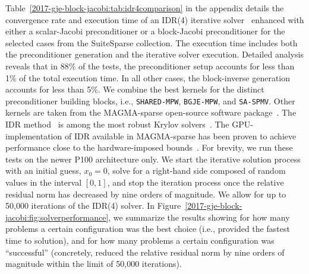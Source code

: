 Table~\ref{2017-gje-block-jacobi:tab:idr4comparison} in the appendix details the convergence rate and
execution time of an IDR(4) iterative solver~\cite{idr1} enhanced with either a
scalar-Jacobi preconditioner or a block-Jacobi preconditioner for the selected
cases from the SuiteSparse collection. The execution time includes both the
preconditioner generation and the iterative solver execution. 
Detailed analysis reveals that in 88\% of the tests, the preconditioner setup
accounts for less than 1\% of the total execution time. In all other cases, the
block-inverse generation accounts for less than 5\%.
We combine the best
kernels for the distinct preconditioner building blocks, i.e., {\tt SHARED-MPW},
{\tt BGJE-MPW}, and {\tt SA-SPMV}. Other kernels are taken from the MAGMA-sparse
open-source software package~\cite{magma}. The IDR method~\cite{idr} is among the 
most robust Krylov solvers~\cite{ashes2016}. The GPU-implementation of IDR available in
MAGMA-sparse has been proven to achieve performance close to the hardware-imposed
bounds~\cite{ijhpca2016}. For brevity, we run these tests on the newer P100
architecture only. We start the iterative solution process with an initial guess, 
$x_0=0$, solve for a right-hand side composed of random values in the interval
$[0,1]$, and stop the iteration process once the relative residual norm has
decreased by nine orders of magnitude. We allow for up to 50,000 iterations of
the IDR(4) solver. In Figure~\ref{2017-gje-block-jacobi:fig:solverperformance}, we summarize the
results showing for how many problems a certain configuration was the best
choice (i.e., provided the fastest time to solution), and for how many problems
a certain configuration was ``successful'' (concretely, reduced the relative
residual norm by nine orders of magnitude within the limit of 50,000
iterations).


